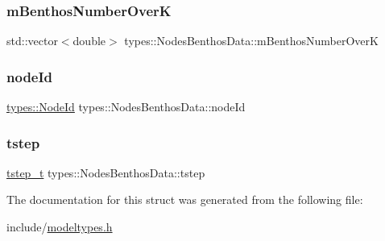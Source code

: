 \subsubsection{\texorpdfstring{mBenthosNumberOverK}{mBenthosNumberOverK}}
{\footnotesize\ttfamily std\+::vector$<$double$>$ types\+::\+Nodes\+Benthos\+Data\+::m\+Benthos\+Number\+OverK}

\mbox{\label{structtypes_1_1_nodes_benthos_data_ab6776c10f2c1db891ccc39e254af8351}} 
\subsubsection{\texorpdfstring{nodeId}{nodeId}}
{\footnotesize\ttfamily \mbox{\hyperlink{classtypes_1_1_node_id}{types\+::\+Node\+Id}} types\+::\+Nodes\+Benthos\+Data\+::node\+Id}

\mbox{\label{structtypes_1_1_nodes_benthos_data_a463db001595acfdcd8ec29c67f57dd8b}} 
\subsubsection{\texorpdfstring{tstep}{tstep}}
{\footnotesize\ttfamily \mbox{\hyperlink{namespacetypes_a9dc53a5ce11a196d82a6983030de8028}{tstep\+\_\+t}} types\+::\+Nodes\+Benthos\+Data\+::tstep}



The documentation for this struct was generated from the following file\+:\begin{DoxyCompactItemize}
\item 
include/\mbox{\hyperlink{modeltypes_8h}{modeltypes.\+h}}\end{DoxyCompactItemize}
